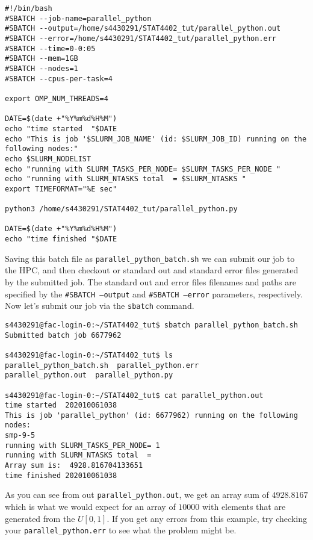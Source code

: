 \begin{verbatim}
#!/bin/bash
#SBATCH --job-name=parallel_python
#SBATCH --output=/home/s4430291/STAT4402_tut/parallel_python.out
#SBATCH --error=/home/s4430291/STAT4402_tut/parallel_python.err
#SBATCH --time=0-0:05
#SBATCH --mem=1GB
#SBATCH --nodes=1
#SBATCH --cpus-per-task=4

export OMP_NUM_THREADS=4

DATE=$(date +"%Y%m%d%H%M")
echo "time started  "$DATE
echo "This is job '$SLURM_JOB_NAME' (id: $SLURM_JOB_ID) running on the following nodes:"
echo $SLURM_NODELIST
echo "running with SLURM_TASKS_PER_NODE= $SLURM_TASKS_PER_NODE "
echo "running with SLURM_NTASKS total  = $SLURM_NTASKS "
export TIMEFORMAT="%E sec"

python3 /home/s4430291/STAT4402_tut/parallel_python.py

DATE=$(date +"%Y%m%d%H%M")
echo "time finished "$DATE
\end{verbatim}
Saving this batch file as \texttt{parallel\_python\_batch.sh} we can submit our job to the HPC, and then checkout or standard out and standard error files generated by the submitted job. The standard out and error files filenames and paths are specified by the \texttt{\#SBATCH --output} and \texttt{\#SBATCH --error} parameters, respectively. Now let's submit our job via the \texttt{sbatch} command.
\begin{verbatim}
s4430291@fac-login-0:~/STAT4402_tut$ sbatch parallel_python_batch.sh 
Submitted batch job 6677962

s4430291@fac-login-0:~/STAT4402_tut$ ls
parallel_python_batch.sh  parallel_python.err  
parallel_python.out  parallel_python.py

s4430291@fac-login-0:~/STAT4402_tut$ cat parallel_python.out 
time started  202010061038
This is job 'parallel_python' (id: 6677962) running on the following nodes:
smp-9-5
running with SLURM_TASKS_PER_NODE= 1 
running with SLURM_NTASKS total  =  
Array sum is:  4928.816704133651
time finished 202010061038
\end{verbatim}
As you can see from out \texttt{parallel\_python.out}, we get an array sum of $4928.8167$ which is what we would expect for an array of $10000$ with elements that are generated from the $U \left[ 0,1 \right]$. If you get any errors from this example, try checking your \texttt{parallel\_python.err} to see what the problem might be.